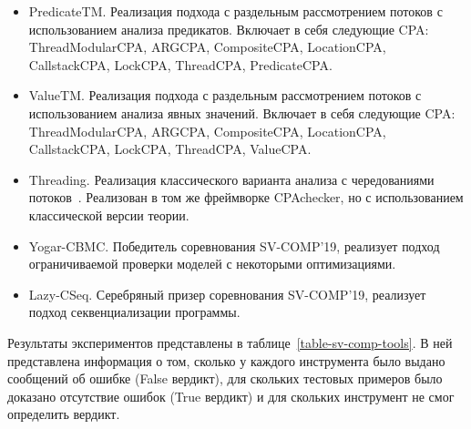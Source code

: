 \begin{itemize}
\item PredicateTM. Реализация подхода с раздельным рассмотрением потоков с использованием анализа предикатов. 
Включает в себя следующие CPA: ThreadModularCPA, ARGCPA, CompositeCPA, LocationCPA, CallstackCPA, LockCPA, ThreadCPA, PredicateCPA.
\item ValueTM. Реализация подхода с раздельным рассмотрением потоков с использованием анализа явных значений. 
Включает в себя следующие CPA: ThreadModularCPA, ARGCPA, CompositeCPA, LocationCPA, CallstackCPA, LockCPA, ThreadCPA, ValueCPA.
\item Threading. Реализация классического варианта анализа с чередованиями потоков~\cite{MEMICS16-Multi-Threaded}. 
Реализован в том же фреймворке CPAchecker, но с использованием классической версии теории.
\item Yogar-CBMC. Победитель соревнования SV-COMP'19, реализует подход ограничиваемой проверки моделей с некоторыми оптимизациями.
\item Lazy-CSeq. Серебряный призер соревнования SV-COMP'19, реализует подход секвенциализации программы.
\end{itemize}

Результаты экспериментов представлены в таблице~\ref{table-sv-comp-tools}.
В ней представлена информация о том, сколько у каждого инструмента было выдано сообщений об ошибке (False вердикт), для скольких тестовых примеров было доказано отсутствие ошибок (True вердикт) и для скольких инструмент не смог определить вердикт.

